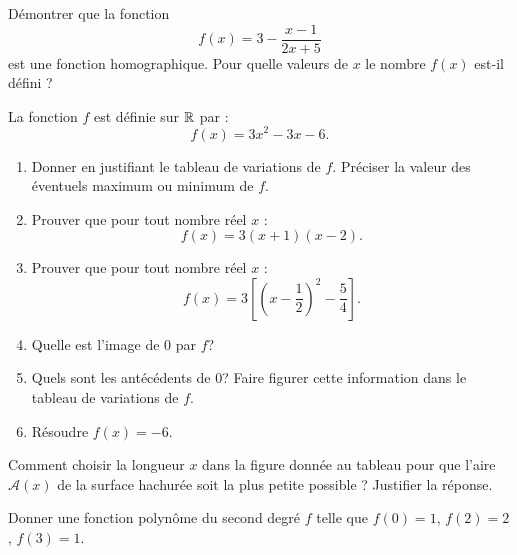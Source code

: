 \documentclass[a4paper,11pt,DIV18,BCOR0mm]{scrartcl}
\begin{document}
\begin{exercice}
 Démontrer que la fonction 
\[
 f(x)=3-\frac{x-1}{2x+5}
\]
est une fonction homographique. Pour quelle valeurs de $x$ le nombre $f(x)$ est-il défini ?
\end{exercice}

\begin{exercice}
 La fonction $f$ est définie sur $\mathbb{R}$ par :
\[
 f(x)=3x^2-3x-6.
\]
\begin{enumerate}
 \item Donner en justifiant le tableau de variations de $f$. Préciser la valeur des 
éventuels maximum ou minimum de $f$.
 \item Prouver que pour tout nombre réel $x$ :
\[
 f(x)=3(x+1)(x-2).
\]
  \item Prouver que pour tout nombre réel $x$ :
\[
 f(x)=3[(x-\frac12)^2-\frac54].
\]
  \item Quelle est l'image de 0 par $f$?
  \item Quels sont les antécédents de 0? Faire figurer cette information dans le tableau de variations de $f$.
  \item Résoudre $f(x)=-6$.
\end{enumerate}
\end{exercice}

\begin{exercice}
Comment choisir la longueur $x$ dans la figure donnée au tableau pour que l'aire $\mathcal{A}(x)$ de la surface hachurée soit la plus petite possible ?
Justifier la réponse.
\end{exercice}

\begin{exercice}
 Donner une fonction polynôme du second degré $f$ telle que $f(0)=1$, $f(2)=2$, $f(3)=1$.
\end{exercice}
\end{document}
